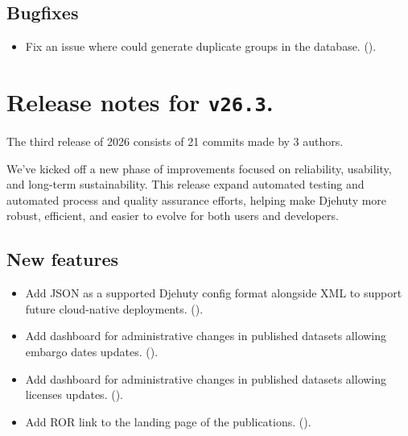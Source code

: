 \subsection*{Bugfixes}
\begin{itemize}
\item{Fix an issue where  could generate duplicate groups in the database.
    ().}
\end{itemize}

\section*{Release notes for \texttt{v26.3}.}

  The third release of 2026 consists of 21 commits made by 3 authors.

  We’ve kicked off a new phase of improvements focused on reliability, usability, 
and long-term sustainability. This release expand automated testing and automated 
process and quality assurance efforts, helping make Djehuty more robust, efficient, 
and easier to evolve for both users and developers.

\subsection*{New features}
\begin{itemize}
\item{Add JSON as a supported Djehuty config format alongside XML to support future cloud-native deployments.
    ().}
\item{Add dashboard for administrative changes in published datasets allowing embargo dates updates.
    ().}
\item{Add dashboard for administrative changes in published datasets allowing licenses updates.
    ().}
\item{Add ROR link to the landing page of the publications.
    ().}
\end{itemize}

